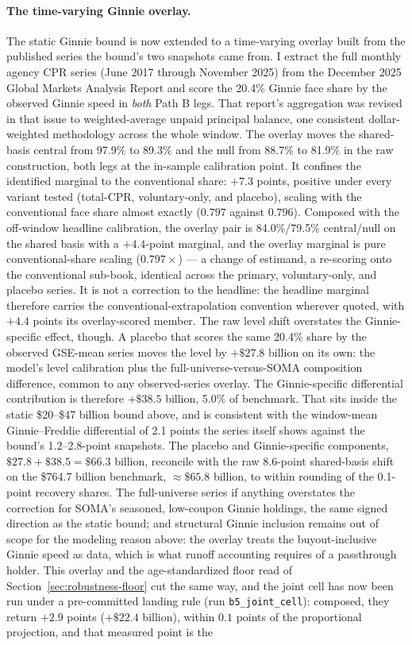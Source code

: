 \documentclass[12pt]{article}
\begin{document}
\paragraph{The time-varying Ginnie overlay.}
The static Ginnie bound is now extended to a time-varying overlay built from the published series the bound's two snapshots came from. I extract the full monthly agency CPR series (June 2017 through November 2025) from the December 2025 Global Markets Analysis Report and score the 20.4\% Ginnie face share by the observed Ginnie speed in \emph{both} Path B legs. That report's aggregation was revised in that issue to weighted-average unpaid principal balance, one consistent dollar-weighted methodology across the whole window. The overlay moves the shared-basis central from 97.9\% to 89.3\% and the null from 88.7\% to 81.9\% in the raw construction, both legs at the in-sample calibration point. It confines the identified marginal to the conventional share: $+7.3$ points, positive under every variant tested (total-CPR, voluntary-only, and placebo), scaling with the conventional face share almost exactly ($0.797$ against $0.796$). Composed with the off-window headline calibration, the overlay pair is 84.0\%/79.5\% central/null on the shared basis with a $+4.4$-point marginal, and the overlay marginal is pure conventional-share scaling ($0.797\times$) --- a change of estimand, a re-scoring onto the conventional sub-book, identical across the primary, voluntary-only, and placebo series. It is not a correction to the headline: the headline marginal therefore carries the conventional-extrapolation convention wherever quoted, with $+4.4$ points its overlay-scored member. The raw level shift overstates the Ginnie-specific effect, though. A placebo that scores the same 20.4\% share by the observed GSE-mean series moves the level by $+\$27.8$ billion on its own: the model's level calibration plus the full-universe-versus-SOMA composition difference, common to any observed-series overlay. The Ginnie-specific differential contribution is therefore $+\$38.5$ billion, 5.0\% of benchmark. That sits inside the static \$20--\$47 billion bound above, and is consistent with the window-mean Ginnie--Freddie differential of 2.1 points the series itself shows against the bound's 1.2--2.8-point snapshots. The placebo and Ginnie-specific components, $\$27.8 + \$38.5 = \$66.3$ billion, reconcile with the raw 8.6-point shared-basis shift on the \$764.7 billion benchmark, $\approx\$65.8$ billion, to within rounding of the 0.1-point recovery shares. The full-universe series if anything overstates the correction for SOMA's seasoned, low-coupon Ginnie holdings, the same signed direction as the static bound; and structural Ginnie inclusion remains out of scope for the modeling reason above: the overlay treats the buyout-inclusive Ginnie speed as data, which is what runoff accounting requires of a passthrough holder. This overlay and the age-standardized floor read of Section~\ref{sec:robustness-floor} cut the same way, and the joint cell has now been run under a pre-committed landing rule (run \texttt{b5\_joint\_cell}): composed, they return $+2.9$ points ($+\$22.4$ billion), within $0.1$ points of the proportional projection, and that measured point is the 
\end{document}
